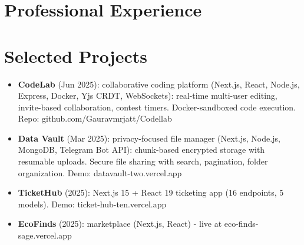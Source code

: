 \documentclass[11pt,a4paper,sans]{moderncv}
\begin{document}

\section{Professional Experience}
\vspace{3pt}


\vspace{2pt}


\section{Selected Projects}
\vspace{1pt}
\begin{itemize}
    \item {\textbf{CodeLab} (Jun 2025): collaborative coding platform (Next.js, React, Node.js, Express, Docker, Yjs CRDT, WebSockets): real-time multi-user editing, invite-based collaboration, contest timers. Docker-sandboxed code execution. Repo: github.com/Gauravmrjatt/Codellab}
    \item {\textbf{Data Vault} (Mar 2025): privacy-focused file manager (Next.js, Node.js, MongoDB, Telegram Bot API): chunk-based encrypted storage with resumable uploads. Secure file sharing with search, pagination, folder organization. Demo: datavault-two.vercel.app}
    \item {\textbf{TicketHub} (2025): Next.js 15 + React 19 ticketing app (16 endpoints, 5 models). Demo: ticket-hub-ten.vercel.app}
    \item {\textbf{EcoFinds} (2025): marketplace (Next.js, React) - live at eco-finds-sage.vercel.app}
\end{itemize}
\end{document}

